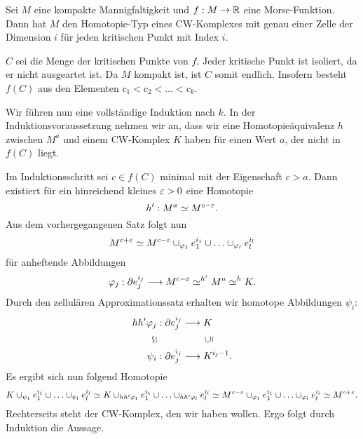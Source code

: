 Sei $M$ eine kompakte Mannigfaltigkeit und $f : M \overset{{}}{\rightarrow} \mathbb{R}$ eine Morse-Funktion. Dann hat $M$ den Homotopie-Typ eines CW-Komplexes mit genau einer Zelle der Dimension $i$ für jeden kritischen Punkt mit Index $i$.
\begin{Beweis}{}
$C$ sei die Menge der kritischen Punkte von $f$. Jeder kritische Punkt ist isoliert, da er nicht ausgeartet ist. Da $M$ kompakt ist, ist $C$ somit endlich. Insofern besteht $f(C)$ aus den Elementen $c_1< c_2 < \ldots < c_k$.

Wir führen nun eine vollständige Induktion nach $k$. In der Induktionsvoraussetzung nehmen wir an, dass wir eine Homotopieäquivalenz $h$ zwischen $M^a$ und einem CW-Komplex $K$ haben für einen Wert $a$, der nicht in $f(C)$ liegt.

Im Induktionsschritt sei $c \in f(C)$ minimal mit der Eigenschaft $c > a$. Dann existiert für ein hinreichend kleines $\varepsilon > 0$ eine Homotopie
\[ h' : M^a \simeq M^{c-\varepsilon}. \]
Aus dem vorhergegangenen Satz folgt nun
\[ M^{c+\varepsilon} \simeq M^{c-\varepsilon} \cup_{\varphi_1}e_1^{i_1}\cup \ldots \cup_{\varphi_l}e_l^{i_l} \]
für anheftende Abbildungen
\[ \varphi_j : \partial e_j^{i_j} \overset{}{\longrightarrow} M^{c-\varepsilon} \simeq^{h'} M^a \simeq^h K. \]
Durch den zellulären Approximationssatz erhalten wir homotope Abbildungen $\psi_i$:
\begin{align*}
hh'\phi_j & : \partial e_j^{i_j} \Pfeil{}  K\\
\rott{\simeq}& ~~~~~~~~~~~~~~\rott{\supseteq}\\
\psi_i & : \partial e_j^{i_j} \Pfeil{}  K^{i_j -1}.
\end{align*}
Es ergibt sich nun folgend Homotopie
\begin{align*}
K\cup_{\psi_1} e_1^{i_1} \cup \ldots \cup_{\psi_l} e_l^{i_l} 
\simeq
K\cup_{hh'\varphi_1} e_1^{i_1} \cup \ldots \cup_{hh'\varphi_l} e_l^{i_l}
\simeq
M^{c-\varepsilon}\cup_{\varphi_1} e_1^{i_1} \cup \ldots \cup_{\varphi_l} e_l^{i_l}
\simeq M^{c+\varepsilon}.
\end{align*}
Rechterseits steht der CW-Komplex, den wir haben wollen. Ergo folgt durch Induktion die Aussage.
\end{Beweis}
